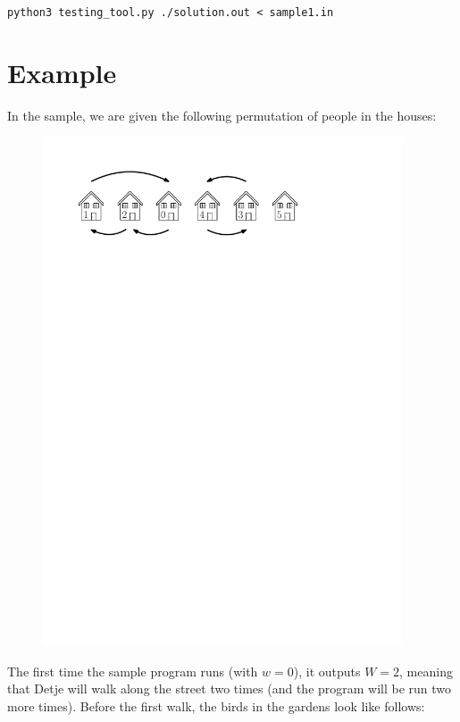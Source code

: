     \verb|python3 testing_tool.py ./solution.out < sample1.in|

\section*{Example}
In the sample, we are given the following permutation of people in the houses:

\begin{figure}[h]
\centering
\includegraphics[width=0.95\textwidth]{s1perm}
\end{figure}

The first time the sample program runs (with $w = 0$), it outputs $W = 2$, meaning that Detje will walk along the street two times (and the program will be run two more times).
Before the first walk, the birds in the gardens look like follows:

